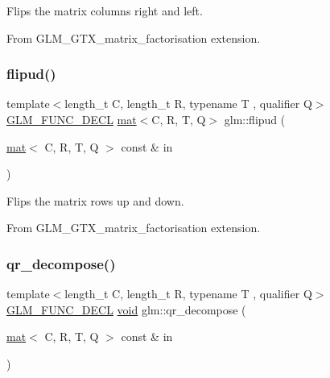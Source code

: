 Flips the matrix columns right and left.

From G\+L\+M\+\_\+\+G\+T\+X\+\_\+matrix\+\_\+factorisation extension. \mbox{\label{group__gtx__matrix__factorisation_ga85003371f0ba97380dd25e8905de1870}} 
\subsubsection{\texorpdfstring{flipud()}{flipud()}}
{\footnotesize\ttfamily template$<$length\+\_\+t C, length\+\_\+t R, typename T , qualifier Q$>$ \\
\hyperlink{setup_8hpp_ab2d052de21a70539923e9bcbf6e83a51}{G\+L\+M\+\_\+\+F\+U\+N\+C\+\_\+\+D\+E\+CL} \hyperlink{structglm_1_1mat}{mat}$<$C, R, T, Q$>$ glm\+::flipud (\begin{DoxyParamCaption}\item[{\hyperlink{structglm_1_1mat}{mat}$<$ C, R, T, Q $>$ const \&}]{in }\end{DoxyParamCaption})}

Flips the matrix rows up and down.

From G\+L\+M\+\_\+\+G\+T\+X\+\_\+matrix\+\_\+factorisation extension. \mbox{\label{group__gtx__matrix__factorisation_ga77022dca1aa38add548f9f56a9f8071a}} 
\subsubsection{\texorpdfstring{qr\+\_\+decompose()}{qr\_decompose()}}
{\footnotesize\ttfamily template$<$length\+\_\+t C, length\+\_\+t R, typename T , qualifier Q$>$ \\
\hyperlink{setup_8hpp_ab2d052de21a70539923e9bcbf6e83a51}{G\+L\+M\+\_\+\+F\+U\+N\+C\+\_\+\+D\+E\+CL} \hyperlink{_s_d_l__opengles2__gl2ext_8h_ae5d8fa23ad07c48bb609509eae494c95}{void} glm\+::qr\+\_\+decompose (\begin{DoxyParamCaption}\item[{\hyperlink{structglm_1_1mat}{mat}$<$ C, R, T, Q $>$ const \&}]{in }\end{DoxyParamCaption})}

